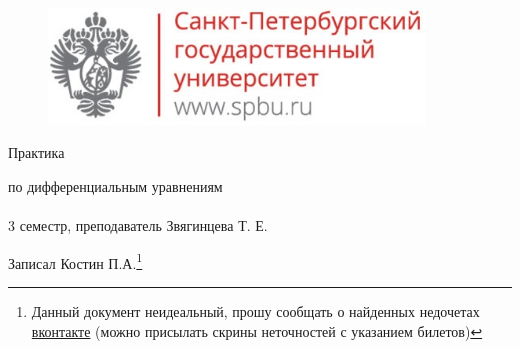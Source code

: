 \documentclass[main]{subfiles}
\begin{document}
	\begin{figure}[H]
			\includegraphics[width=10cm]{../../../template/spsu.jpg}
			\centering
	\end{figure}
	\vspace*{\fill}
	\begin{center}
		\huge Практика

		\huge по дифференциальным уравнениям\\ \ \\
		\Large 3 семестр, преподаватель Звягинцева Т. Е.

		\large Записал Костин П.А.\footnote{Данный документ неидеальный, прошу сообщать о найденных недочетах \href{https://vk.com/drab_existence_a}{вконтакте} (можно присылать скрины неточностей с указанием билетов)}
	\end{center}
	\vspace*{\fill}
	\vspace*{\fill}

	\newpage
	\tableofcontents
	\newpage
\end{document}

